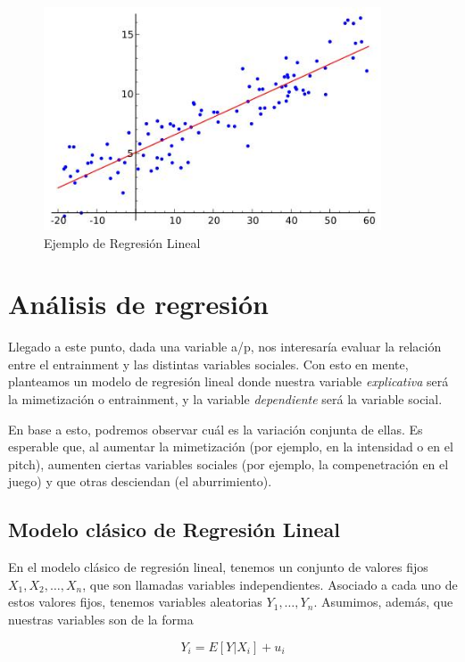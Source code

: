
\begin{figure}[h]
\centering
\includegraphics[width=10cm]{images/linear_regression.jpg}
\caption{Ejemplo de Regresión Lineal}
\end{figure}

\section{Análisis de regresión}

Llegado a este punto, dada una variable a/p, nos interesaría evaluar la relación entre el entrainment y las distintas variables sociales. Con esto en mente, planteamos un modelo de regresión lineal donde nuestra variable \emph{explicativa} será la mimetización o entrainment, y la variable \emph{dependiente} será la variable social.

En base a esto, podremos observar cuál es la variación conjunta de ellas. Es esperable que, al aumentar la mimetización (por ejemplo, en la intensidad o en el pitch), aumenten ciertas variables sociales (por ejemplo, la compenetración en el juego) y que otras desciendan (el aburrimiento).


\subsection{Modelo clásico de Regresión Lineal}

En el modelo clásico de regresión lineal, tenemos un conjunto de valores fijos $X_1, X_2, \ldots, X_n$, que son llamadas variables independientes. Asociado a cada uno de estos valores fijos, tenemos variables aleatorias $Y_1, \ldots, Y_n$. Asumimos, además, que nuestras variables son de la forma

\begin{equation}
  Y_i = E[Y|X_i] + u_i
\end{equation}

